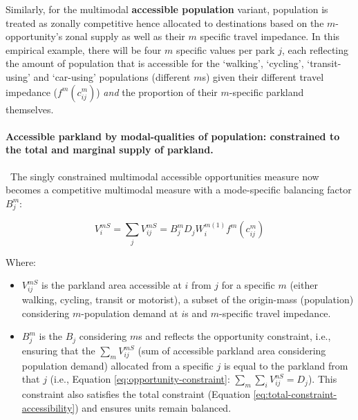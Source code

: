 \documentclass[
11pt, %
oneside, %
english, %
singlespacing, %
]{macthesis} %
\def\tightlist{}
\begin{document}
Similarly, for the multimodal \textbf{accessible population} variant, population is treated as zonally competitive hence allocated to destinations based on the \(m\)-opportunity's zonal supply as well as their \(m\) specific travel impedance. In this empirical example, there will be four \(m\) specific values per park \(j\), each reflecting the amount of population that is accessible for the `walking', `cycling', `transit-using' and `car-using' populations (different \(m\)s) given their different travel impedance (\(f^m(c^m_{ij})\)) \emph{and} the proportion of their \(m\)-specific parkland themselves.

\paragraph{Accessible parkland by modal-qualities of population: constrained to the total and marginal supply of parkland.}\label{accessible-parkland-by-modal-qualities-of-population-constrained-to-the-total-and-marginal-supply-of-parkland.}

~The singly constrained multimodal accessible opportunities measure now becomes a competitive multimodal measure with a mode-specific balancing factor \(B_j^{m}\):

\begin{equation}
\label{eq:singly-constrained-multimodal-accessibility-park}
V^{mS}_{i} = \sum_j V^{mS}_{ij} = B_j^{m} D_j W_i^{m(1)} f^m(c^m_{ij})
\end{equation} 

Where:

\begin{itemize}
\tightlist
\item
  \(V^{mS}_{ij}\) is the parkland area accessible at \(i\) from \(j\) for a specific \(m\) (either walking, cycling, transit or motorist), a subset of the origin-mass (population) considering \(m\)-population demand at \(i\)s and \(m\)-specific travel impedance.
\item
  \(B_j^{m}\) is the \(B_j\) considering \(m\)s and reflects the opportunity constraint, i.e., ensuring that the \(\sum_m V^{mS}_{ij}\) (sum of accessible parkland area considering population demand) allocated from a specific \(j\) is equal to the parkland from that \(j\) (i.e., Equation \ref{eq:opportunity-constraint}: \(\sum_m \sum_i V^{nS}_{ij} =  D_j\)). This constraint also satisfies the total constraint (Equation \ref{eq:total-constraint-accessibility}) and ensures units remain balanced.
\end{itemize}
\end{document}
